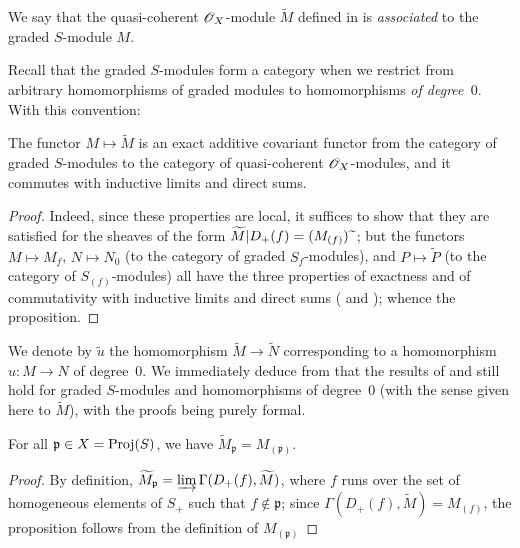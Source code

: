 \begin{definition}[2.5.3]
\label{II.2.5.3}
We say that the quasi-coherent $\mathscr{O}_X$-module $\widetilde{M}$ defined in  is \emph{associated} to the graded $S$-module $M$.
\end{definition}

Recall that the graded $S$-modules form a category when we restrict from arbitrary homomorphisms of graded modules to homomorphisms \emph{of degree~$0$}.
With this convention:

\begin{proposition}[2.5.4]
\label{II.2.5.4}
The functor $M\mapsto\widetilde{M}$ is an exact additive covariant functor from the category of graded $S$-modules to the category of quasi-coherent $\mathscr{O}_X$-modules, and it commutes with inductive limits and direct sums.
\end{proposition}

\begin{proof}
Indeed, since these properties are local, it suffices to show that they are satisfied for the sheaves of the form $\widetilde{M}|D_+(f)=(M_{(f)}){\,\widetilde{\,}\,}$;
but the functors $M\mapsto M_f$, $N\mapsto N_0$ (to the category of graded $S_f$-modules), and $P\mapsto\widetilde{P}$ (to the category of $S_{(f)}$-modules) all have the three properties of exactness and of commutativity with inductive limits and direct sums ( and );
whence the proposition.
\end{proof}

We denote by $\widetilde{u}$ the homomorphism $\widetilde{M}\to\widetilde{N}$ corresponding to a homomorphism $u: M\to N$ of degree~$0$.
We immediately deduce from  that the results of  and  still hold for graded $S$-modules and homomorphisms of degree~$0$ (with the sense given here to $\widetilde{M}$), with the proofs being purely formal.

\begin{proposition}[2.5.5]
\label{II.2.5.5}
For all $\mathfrak{p}\in X=\operatorname{Proj}(S)$, we have $\widetilde{M}_\mathfrak{p}=M_{(\mathfrak{p})}$.
\end{proposition}

\begin{proof}
By definition, $\widetilde{M}_\mathfrak{p}=\varinjlim\Gamma(D_+(f),\widetilde{M})$, where $f$ runs over the set of homogeneous elements of $S_+$ such that $f\not\in\mathfrak{p}$;
since $\Gamma(D_+(f),\widetilde{M})=M_{(f)}$, the proposition follows from the definition of $M_{(\mathfrak{p})}$ 
\end{proof}


